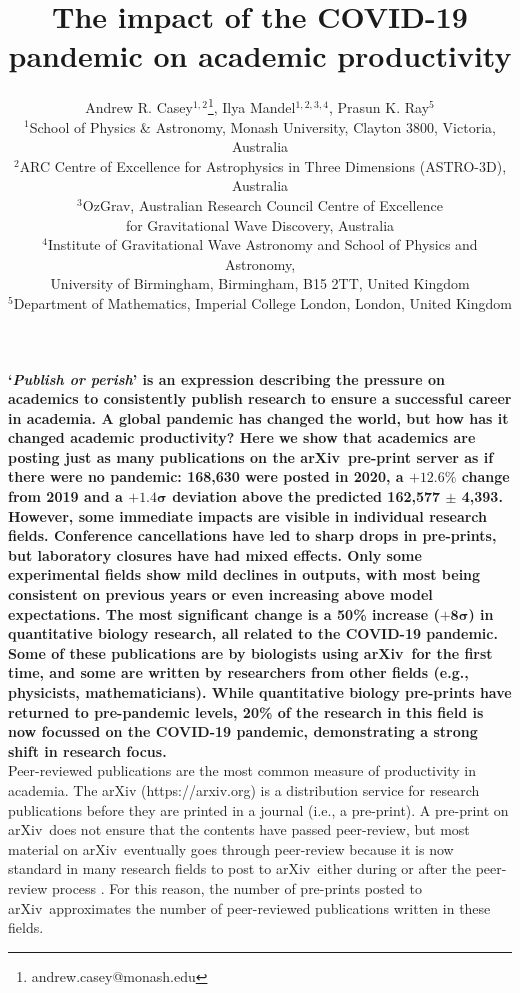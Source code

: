 \documentclass[a4paper,12pt]{article}
\title{The impact of the COVID-19 pandemic on academic productivity}
\author{Andrew R. Casey$^{1,2}$\footnote{andrew.casey@monash.edu},
        Ilya Mandel$^{1,2,3,4}$,
        Prasun K. Ray$^{5}$\\
\normalsize{$^{1}$School of Physics \& Astronomy, Monash University, Clayton 3800, Victoria, Australia}\\
\normalsize{$^{2}$ARC Centre of Excellence for Astrophysics in Three Dimensions (ASTRO-3D), Australia}\\
\normalsize{$^{3}$OzGrav, Australian Research Council Centre of Excellence}\\
\normalsize{for Gravitational Wave Discovery, Australia}\\
\normalsize{$^{4}$Institute of Gravitational Wave Astronomy and School of Physics and Astronomy,}\\
\normalsize{University of Birmingham, Birmingham, B15 2TT, United Kingdom}\\
\normalsize{$^{5}$Department of Mathematics, Imperial College London, London, United Kingdom}
}
\date{}
\newcommand{\arxiv}{arXiv}
\begin{document}
\newpage
\setcounter{page}{1}
\resetlinenumber[1]

\maketitle


\noindent \textbf{`\emph{Publish or perish}' is an expression describing the pressure on academics to consistently publish research to ensure a successful career in academia. 
A global pandemic has changed the world, but how has it changed academic productivity?
Here we show that academics are posting just as many publications on the \arxiv\ pre-print server as if there were no pandemic: 168,630 were posted in 2020, a $\mathbf{+12.6\%}$ change from 2019 and a $\mathbf{+1.4\sigma}$ deviation above the predicted 162,577 $\mathbf{\pm}$ 4,393.
However, some immediate impacts are visible in individual research fields.
Conference cancellations have led to sharp drops in pre-prints, but laboratory closures have had mixed effects.
Only some experimental fields show mild declines in outputs, with most being consistent on previous years or even increasing above model expectations.
The most significant change is a 50\% increase ($\mathbf{+8\sigma}$) in quantitative biology research, all related to the COVID-19 pandemic.
Some of these publications are by biologists using \arxiv\ for the first time, and some are written by researchers from other fields (e.g., physicists, mathematicians).
While quantitative biology pre-prints have returned to pre-pandemic levels, 20\% of the research in this field is now focussed on the COVID-19 pandemic, demonstrating a strong shift in research focus.
}\\

\noindent Peer-reviewed publications are the most common measure of productivity in academia. The \arxiv\cite{Ginsparg:2011} ({https://arxiv.org}) is a distribution service for research publications before they are printed in a journal (i.e., a pre-print). A pre-print on \arxiv\ does not ensure that the contents have passed peer-review, but most material on \arxiv\ eventually goes through peer-review because it is now standard in many research fields to post to \arxiv\ either during or after the peer-review process \cite{Lariviere:2014}. For this reason, the number of pre-prints posted to \arxiv\ approximates the number of peer-reviewed publications written in these fields.
\end{document}
